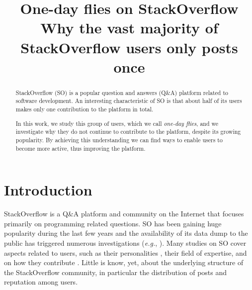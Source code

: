 \documentclass[conference]{IEEEtran}
\newcommand{\eg}{\emph{e.g.},\xspace}
\newcommand\odf{\emph{one-day flies}\xspace}
\begin{document}
\title{One-day flies on StackOverflow\\
{\LARGE Why the vast majority of StackOverflow users only posts once}}



\author{
}





\maketitle


\begin{abstract}


StackOverflow (SO) is a popular question and answers (Q\&A) platform related to
software development. An interesting characteristic of SO is that about 
half of its users makes only one contribution to the platform in total.

In this work, we study this group of users, which we call \odf, and we 
investigate why they do not continue to contribute to the platform, despite its
growing popularity. By achieving this understanding we can find ways to enable
users to become more active, thus improving the platform. 
\end{abstract}

\IEEEpeerreviewmaketitle



\section{Introduction}

StackOverflow is a Q\&A platform and community on the Internet that focuses 
primarily on programming related questions. SO has been gaining huge popularity during the last few years
\cite{anderson2012discovering} and the availability of its data dump to the
public has triggered numerous investigations (\eg
\cite{treude2011programmers,barua2014developers,morrison2013age}). 
Many studies on SO cover aspects related to users, such as their personalities
\cite{bosu2013building}, their field of expertise, and on how they
contribute \cite{movshovitz2013analysis}. Little is know, yet, about the 
underlying structure of the StackOverflow community, in particular the 
distribution of posts and reputation among users.
\end{document}
